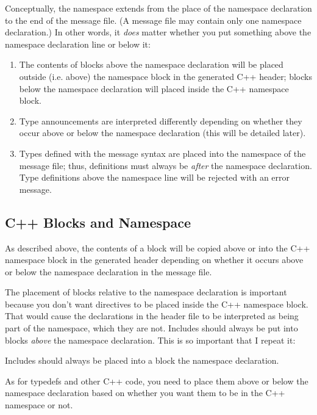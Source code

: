 Conceptually, the namespace extends from the place of the namespace
declaration to the end of the message file. (A message file may contain
only one namespace declaration.) In other words, it \textit{does} matter
whether you put something above the namespace declaration line or below it:

\begin{enumerate}
\item The contents of  blocks above the namespace
      declaration will be placed outside (i.e. above) the namespace block
      in the generated C++ header; blocks below the namespace declaration
      will placed inside the C++ namespace block.
\item Type announcements are interpreted differently depending on whether
      they occur above or below the namespace declaration (this will be
      detailed later).
\item Types defined with the message syntax are placed into the namespace
      of the message file; thus, definitions must always be \textit{after}
      the namespace declaration. Type definitions above the namespace line
      will be rejected with an error message.
\end{enumerate}

\subsection{C++ Blocks and Namespace}

As described above, the contents of a  block will be
copied above or into the C++ namespace block in the generated header
depending on whether it occurs above or below the namespace declaration in
the message file.

The placement of  blocks relative to the namespace
declaration is important because you don't want  directives
to be placed inside the C++ namespace block. That would cause the
declarations in the header file to be interpreted as being part of the
namespace, which they are not. Includes should always be put into
 blocks \textit{above} the namespace declaration. This is so
important that I repeat it:

\begin{important}
Includes should always be placed into a  block 
the namespace declaration.
\end{important}

As for typedefs and other C++ code, you need to place them above or below
the namespace declaration based on whether you want them to be in the C++
namespace or not.

